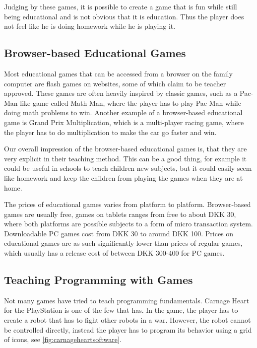 Judging by these games, it is possible to create a game that is fun while still being educational and is not obvious that it is education. Thus the player does not feel like he is doing homework while he is playing it.

\subsection{Browser-based Educational Games}
Most educational games that can be accessed from a browser on the family computer are flash games on websites, some of which claim to be teacher approved.
These games are often heavily inspired by classic games, such as a Pac-Man like game called Math Man, where the player has to play Pac-Man while doing math problems to win.\cite{mathman} Another example of a browser-based educational game is Grand Prix Multiplication, which is a multi-player racing game, where the player has to do multiplication to make the car go faster and win.\cite{grandprix}\newline

Our overall impression of the browser-based educational games is, that they are very explicit in their teaching method.
This can be a good thing, for example it could be useful in schools to teach children new subjects, but it could easily seem like homework and keep the children from playing the games when they are at home.\newline

The prices of educational games varies from platform to platform. 
Browser-based games are usually free, games on tablets ranges from free to about DKK 30, where both platforms are possible subjects to a form of micro transaction system.
Downloadable PC games cost from DKK 30 to around DKK 100.
Prices on educational games are as such significantly lower than prices of regular games, which usually has a release cost of between DKK 300-400 for PC games.

\subsection{Teaching Programming with Games}
Not many games have tried to teach programming fundamentals. Carnage Heart for the PlayStation  is one of the few that has. In the game, the player has to create a robot that has to fight other robots in a war. However, the robot cannot be controlled directly, instead the player has to program its behavior using a grid of icons, see \ref{fig:carnageheartsoftware}.


